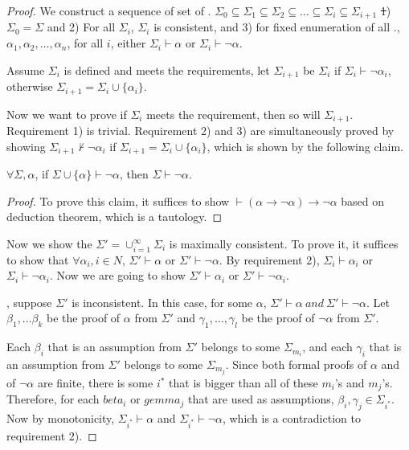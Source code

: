 \begin{proof}
We construct a sequence of set of \wff. $\Sigma_0 \subseteq \Sigma_1 \subseteq \Sigma_2 \subseteq \ldots \subseteq \Sigma_i \subseteq \Sigma_{i+1}$ \st 1) $\Sigma_0 = \Sigma$ and 2) For all $\Sigma_i$, $\Sigma_i$ is consistent, and 3) for fixed enumeration of all \wff., $\alpha_1, \alpha_2, \ldots, \alpha_n$, for all $i$, either $\Sigma_i \vdash \alpha$ or $\Sigma_i \vdash \neg \alpha$.

Assume $\Sigma_i$ is defined and meets the requirements, let $\Sigma_{i+1}$ be $\Sigma_i$ if $\Sigma_i \vdash \neg \alpha_{i}$, otherwise $\Sigma_{i+1} = \Sigma_i \cup \{ \alpha_i \}$. 

Now we want to prove if $\Sigma_i$ meets the requirement, then so will $\Sigma_{i+1}$.
Requirement 1) is trivial. Requirement 2) and 3) are simultaneously proved by showing $\Sigma_{i+1} \nvdash \neg \alpha_i$ if $\Sigma_{i+1} = \Sigma_i \cup \{\alpha_i\}$, which is shown by the following claim.

\begin{claim}
  $\forall \Sigma, \alpha$, if $\Sigma \cup \{ \alpha \} \vdash \neg \alpha$, then $\Sigma \vdash \neg \alpha$. 
\end{claim}
\begin{proof}
  To prove this claim, it suffices to show $\vdash (\alpha \rightarrow \neg \alpha) \rightarrow \neg \alpha$ based on deduction theorem, which is a tautology.
\end{proof}

Now we show the $\Sigma'=\cup_{i=1}^\infty \Sigma_i$ is maximally consistent.
To prove it, it suffices to show that $\forall \alpha_i, i \in N$, $\Sigma' \vdash \alpha$ or $\Sigma' \vdash \neg \alpha$.
By requirement 2), $\Sigma_i \vdash \alpha_i$ or $\Sigma_i \vdash \neg \alpha_i$. Now we are going to show $\Sigma' \vdash \alpha_i$ or $\Sigma' \vdash \neg \alpha_i$.

\bwoc, suppose $\Sigma'$ is inconsistent. In this case, for some $\alpha$, $\Sigma'\vdash\alpha\ and\ \Sigma'\vdash\neg\alpha$. Let $\beta_1,\ldots\beta_k$ be the proof of $\alpha$ from $\Sigma'$ and $\gamma_1,\ldots,\gamma_l$ be the proof of $\neg\alpha$ from $\Sigma'$.

Each $\beta_i$ that is an assumption from $\Sigma'$ belongs to some $\Sigma_{m_i}$, and each $\gamma_i$ that is an assumption from $\Sigma'$ belongs to some $\Sigma_{m_j}$.
Since both formal proofs of $\alpha$ and of $\neg\alpha$ are finite, there is some $i^*$ that is bigger than all of these $m_i$'s and $m_j$'s. Therefore, for each $beta_i$ or $gemma_j$ that are used as assumptions, $\beta_i, \gamma_j \in \Sigma_{i^*}$. Now by monotonicity, $\Sigma_{i^*} \vdash \alpha$ and $\Sigma_{i^*} \vdash \neg \alpha$, which is a contradiction to requirement 2).

\end{proof}

